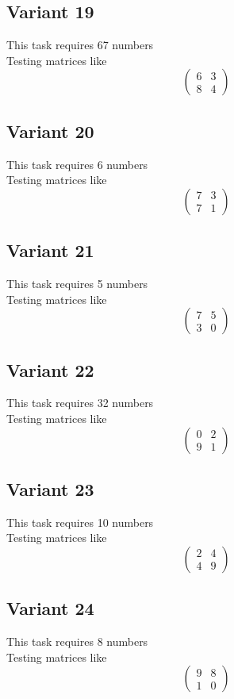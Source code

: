 \documentclass[11pt]{article}
\begin{document}
\subsection*{Variant 19}
This task requires 67 numbers\\
Testing matrices like \[ \begin{pmatrix} 6 & 3\\ 8 & 4 \end{pmatrix} \]

\subsection*{Variant 20}
This task requires 6 numbers\\
Testing matrices like \[ \begin{pmatrix} 7 & 3\\ 7 & 1 \end{pmatrix} \]

\subsection*{Variant 21}
This task requires 5 numbers\\
Testing matrices like \[ \begin{pmatrix} 7 & 5\\ 3 & 0 \end{pmatrix} \]

\subsection*{Variant 22}
This task requires 32 numbers\\
Testing matrices like \[ \begin{pmatrix} 0 & 2\\ 9 & 1 \end{pmatrix} \]

\subsection*{Variant 23}
This task requires 10 numbers\\
Testing matrices like \[ \begin{pmatrix} 2 & 4\\ 4 & 9 \end{pmatrix} \]

\subsection*{Variant 24}
This task requires 8 numbers\\
Testing matrices like \[ \begin{pmatrix} 9 & 8\\ 1 & 0 \end{pmatrix} \]
\end{document}
